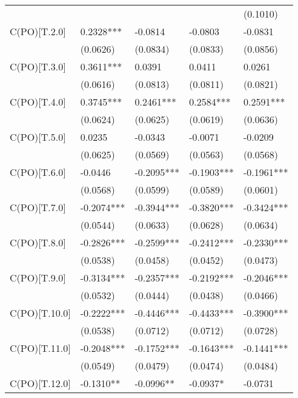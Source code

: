 \begin{table}
\begin{center}
\begin{tabular}{lllll}
                         &            &            &            & (0.1010)    \\
C(PO)[T.2.0]             & 0.2328***  & -0.0814    & -0.0803    & -0.0831     \\
                         & (0.0626)   & (0.0834)   & (0.0833)   & (0.0856)    \\
C(PO)[T.3.0]             & 0.3611***  & 0.0391     & 0.0411     & 0.0261      \\
                         & (0.0616)   & (0.0813)   & (0.0811)   & (0.0821)    \\
C(PO)[T.4.0]             & 0.3745***  & 0.2461***  & 0.2584***  & 0.2591***   \\
                         & (0.0624)   & (0.0625)   & (0.0619)   & (0.0636)    \\
C(PO)[T.5.0]             & 0.0235     & -0.0343    & -0.0071    & -0.0209     \\
                         & (0.0625)   & (0.0569)   & (0.0563)   & (0.0568)    \\
C(PO)[T.6.0]             & -0.0446    & -0.2095*** & -0.1903*** & -0.1961***  \\
                         & (0.0568)   & (0.0599)   & (0.0589)   & (0.0601)    \\
C(PO)[T.7.0]             & -0.2074*** & -0.3944*** & -0.3820*** & -0.3424***  \\
                         & (0.0544)   & (0.0633)   & (0.0628)   & (0.0634)    \\
C(PO)[T.8.0]             & -0.2826*** & -0.2599*** & -0.2412*** & -0.2330***  \\
                         & (0.0538)   & (0.0458)   & (0.0452)   & (0.0473)    \\
C(PO)[T.9.0]             & -0.3134*** & -0.2357*** & -0.2192*** & -0.2046***  \\
                         & (0.0532)   & (0.0444)   & (0.0438)   & (0.0466)    \\
C(PO)[T.10.0]            & -0.2222*** & -0.4446*** & -0.4433*** & -0.3900***  \\
                         & (0.0538)   & (0.0712)   & (0.0712)   & (0.0728)    \\
C(PO)[T.11.0]            & -0.2048*** & -0.1752*** & -0.1643*** & -0.1441***  \\
                         & (0.0549)   & (0.0479)   & (0.0474)   & (0.0484)    \\
C(PO)[T.12.0]            & -0.1310**  & -0.0996**  & -0.0937*   & -0.0731     \\

\end{tabular}
\end{center}
\end{table}
